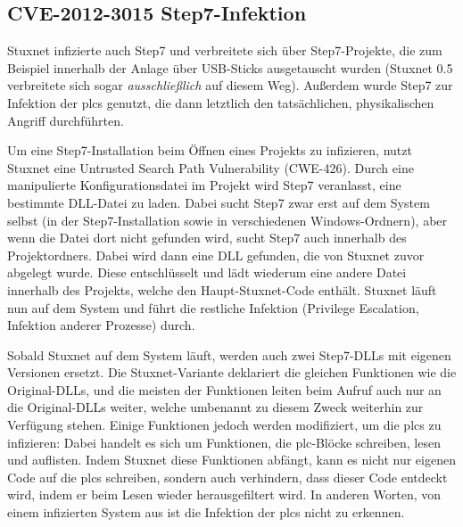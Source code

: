 \documentclass[a4paper]{article}
\begin{document}
\begin{figure}[H]
  
\end{figure}

\subsection{CVE-2012-3015 Step7-Infektion}

Stuxnet infizierte auch Step7 und verbreitete sich über Step7-Projekte,
die zum Beispiel innerhalb der Anlage über USB-Sticks ausgetauscht wurden
(Stuxnet 0.5 verbreitete sich sogar \emph{ausschließlich} auf diesem Weg).
Außerdem wurde Step7 zur Infektion der \glspl{plc} genutzt, die dann letztlich den tatsächlichen, physikalischen Angriff durchführten.

Um eine Step7-Installation beim Öffnen eines Projekts zu infizieren, nutzt Stuxnet eine Untrusted Search Path Vulnerability (CWE-426\cite{cwe_searchpath}).
Durch eine manipulierte Konfigurationsdatei im Projekt wird Step7 veranlasst, eine bestimmte DLL-Datei zu laden.
Dabei sucht Step7 zwar erst auf dem System selbst (in der Step7-Installation sowie in verschiedenen Windows-Ordnern), %
aber wenn die Datei dort nicht gefunden wird, sucht Step7 auch innerhalb des Pro\-jekt\-ord\-ners.
Dabei wird dann eine DLL gefunden, die von Stuxnet zuvor abgelegt wurde.
Diese entschlüsselt und lädt wiederum eine andere Datei innerhalb des Projekts, welche den Haupt-Stuxnet-Code enthält.
Stuxnet läuft nun auf dem System und führt die restliche Infektion (Privilege Escalation, Infektion anderer Prozesse) durch.

Sobald Stuxnet auf dem System läuft, werden auch zwei Step7-DLLs mit eigenen Versionen ersetzt.
Die Stuxnet-Variante deklariert die gleichen Funktionen wie die Original-DLLs,
und die meisten der Funktionen leiten beim Aufruf auch nur an die Original-DLLs weiter,
welche umbenannt zu diesem Zweck weiterhin zur Verfügung stehen.
Einige Funktionen jedoch werden modifiziert, um die \glspl{plc} zu infizieren:
Dabei handelt es sich um Funktionen, die \gls{plc}-Blöcke schreiben, lesen und auflisten.
Indem Stuxnet diese Funktionen abfängt, kann es nicht nur eigenen Code auf die \glspl{plc} schreiben,
sondern auch verhindern, dass dieser Code entdeckt wird, indem er beim Lesen wieder herausgefiltert wird.
In anderen Worten, von einem infizierten System aus ist die Infektion der \glspl{plc} nicht zu erkennen.
\end{document}

